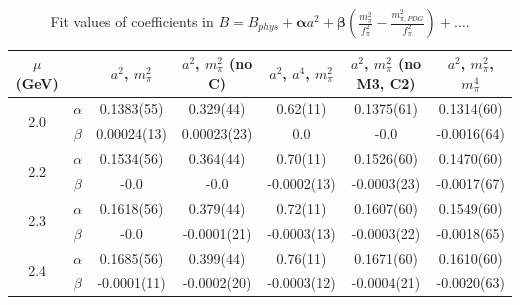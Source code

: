 \documentclass[12pt]{extarticle}
\begin{document}
\begin{table}[h!]
\begin{center}
\begin{tabular}{|c c|c|c|c|c|c|}
\hline
$\mu$ (GeV) &  & $a^2$, $m_\pi^2$& $a^2$, $m_\pi^2$ (no C)& $a^2$, $a^4$, $m_\pi^2$& $a^2$, $m_\pi^2$ (no M3, C2)& $a^2$, $m_\pi^2$, $m_\pi^4$\\
\hline
\multirow{2}{0.5in}{2.0} & $\alpha$ & 0.1383(55)& 0.329(44)& 0.62(11)& 0.1375(61)& 0.1314(60)\\
 & $\beta$ & 0.00024(13)& 0.00023(23)& 0.0& -0.0& -0.0016(64)\\
\hline
\multirow{2}{0.5in}{2.2} & $\alpha$ & 0.1534(56)& 0.364(44)& 0.70(11)& 0.1526(60)& 0.1470(60)\\
 & $\beta$ & -0.0& -0.0& -0.0002(13)& -0.0003(23)& -0.0017(67)\\
\hline
\multirow{2}{0.5in}{2.3} & $\alpha$ & 0.1618(56)& 0.379(44)& 0.72(11)& 0.1607(60)& 0.1549(60)\\
 & $\beta$ & -0.0& -0.0001(21)& -0.0003(13)& -0.0003(22)& -0.0018(65)\\
\hline
\multirow{2}{0.5in}{2.4} & $\alpha$ & 0.1685(56)& 0.399(44)& 0.76(11)& 0.1671(60)& 0.1610(60)\\
 & $\beta$ & -0.0001(11)& -0.0002(20)& -0.0003(12)& -0.0004(21)& -0.0020(63)\\
\hline
\end{tabular}
\caption{Fit values of coefficients in $B = B_{phys} + \mathbf{\alpha} a^2 + \mathbf{\beta}\left(\frac{m_\pi^2}{f_\pi^2}-\frac{m_{\pi,PDG}^2}{f_\pi^2}\right) + \ldots$.}
\end{center}
\end{table}




















\clearpage
\end{document}
